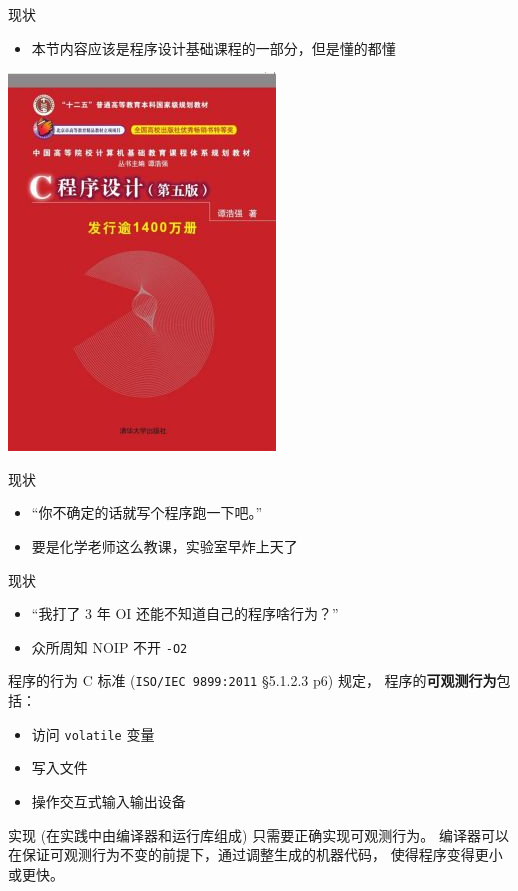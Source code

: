 \documentclass[10pt,mathserif]{beamer}
\begin{document}
\begin{frame}{现状}
	\begin{itemize}
		\item 本节内容应该是程序设计基础课程的一部分，但是懂的都懂
	\end{itemize}
	\begin{center}
		\includegraphics[width=.3\textwidth]{img/shit2.jpg}
	\end{center}
\end{frame}

\begin{frame}{现状}
	\begin{itemize}
		\item “你不确定的话就写个程序跑一下吧。”
			\pause
		\item 要是化学老师这么教课，实验室早炸上天了
	\end{itemize}
\end{frame}

\begin{frame}{现状}
	\begin{itemize}
		\item “我打了 3 年 OI 还能不知道自己的程序啥行为？”
			\pause
		\item 众所周知 NOIP 不开 \texttt{-O2}
	\end{itemize}
\end{frame}

\begin{frame}{程序的行为}
	C 标准 (\texttt{ISO/IEC 9899:2011} \S 5.1.2.3 p6) 规定，
	程序的\textbf{可观测行为}包括：
	\begin{itemize}
		\item 访问 \texttt{volatile} 变量
		\item 写入文件
		\item 操作交互式输入输出设备
	\end{itemize}
	实现 (在实践中由编译器和运行库组成) 只需要正确实现可观测行为。
	编译器可以在保证可观测行为不变的前提下，通过调整生成的机器代码，
	使得程序变得更小或更快。
\end{frame}
\end{document}
